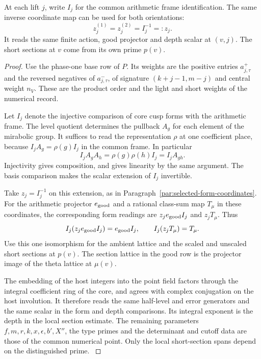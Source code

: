 \begin{lemma}
At each lift \(j\), write \(I_j\) for the common arithmetic frame identification. The same inverse coordinate map can be used for both orientations:
\[
 z_j^{(1)}=z_j^{(2)}=I_j^{-1}=:z_j.
\] It reads the
same finite action, good projector and depth scalar at \((v,j)\).
The short sections at \(v\) come from its own prime \(p(v)\).
\end{lemma}
\begin{proof}
Use the phase-one base row of \(P\). Its weights are the positive
entries \(a^+_{j,\tau}\) and the reversed negatives of
\(a^-_{j,\tau}\), of signature \((k+j-1,m-j)\) and central
weight \(n_V\). These are the product order and the light and
short weights of the numerical record.

Let \(I_j\) denote the injective comparison of core cusp forms
with the arithmetic frame. The level quotient determines the
pullback \(A_g\) for each element of the mirabolic group.
It suffices to read the representation \(\rho\) at one coefficient
place, because \(I_j A_g=\rho(g)I_j\) in the common frame.
In particular
\[
 I_jA_gA_h=\rho(g)\rho(h)I_j=I_jA_{gh}.
\]
Injectivity gives composition, and gives linearity by the same
argument. The basis comparison makes the scalar extension of
\(I_j\) invertible.

Take \(z_j=I_j^{-1}\) on this extension, as
in Paragraph~\ref{par:selected-form-coordinates}. For the
arithmetic projector \(e_{\rm good}\) and a rational class-sum
map \(T_\mu\) in these coordinates, the corresponding form
readings are \(z_je_{\rm good}I_j\) and \(z_jT_\mu\).
Thus
\[
 I_j(z_je_{\rm good}I_j)=e_{\rm good}I_j,\qquad
 I_j(z_jT_\mu)=T_\mu .
\]
Use this one isomorphism for the ambient lattice and the scaled
and unscaled short sections at \(p(v)\). The section lattice in
the good row is the projector image of the theta lattice at
\(\mu(v)\).

The embedding of the host integers into the point field factors
through the integral coefficient ring of the core, and agrees
with complex conjugation on the host involution. It therefore
reads the same half-level and error generators and the same
scalar in the form and depth comparisons. Its integral exponent
is the depth in the local section estimate. The remaining
parameters \(f,m,r,k,x,\epsilon,b',X''\), the type primes and
the determinant and cutoff data are those of the common numerical
point. Only the local short-section spans depend on the
distinguished prime. \label{cor:completed-division-11}
\end{proof}


